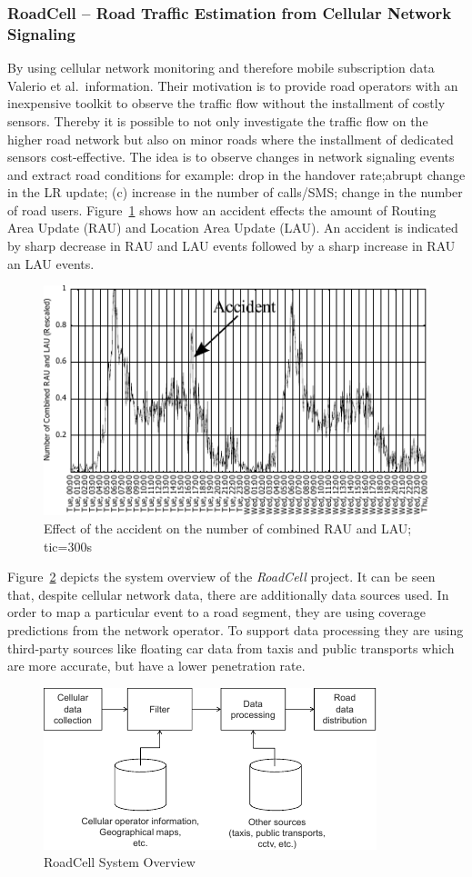 \documentclass[master,english]{hgbthesis}
\begin{document}
\subsubsection{RoadCell -- Road Traffic Estimation from Cellular Network Signaling}
By using cellular network monitoring and therefore mobile subscription data Valerio et al.\ information. Their motivation is to provide road operators with an inexpensive toolkit to observe the traffic flow without the installment of costly sensors. Thereby it is possible to not only investigate the traffic flow on the higher road network but also on minor roads where the installment of dedicated sensors cost-effective.
The idea is to observe changes in network signaling events and extract road conditions for example: drop in the handover rate;abrupt change in the LR update; (c) increase in the number of calls/SMS; change in the number of road users. Figure~\ref{fig:raodcell_accident} shows how an accident effects the amount of Routing Area Update (RAU) and Location Area Update (LAU). An accident is indicated by sharp decrease in RAU and LAU events followed by a sharp increase in RAU an LAU events.
\begin{figure}
\centering
\includegraphics[width=0.7\linewidth]{./images/raodcell_accident}
\caption{Effect of the accident on the number of combined RAU and LAU; tic=300s \cite{Valerio20092}}
\label{fig:raodcell_accident}
\end{figure}
Figure~\ref{fig:roadcell} depicts the system overview of the \emph{RoadCell} project. It can be seen that, despite cellular network data, there are additionally data sources used. In order to map a particular event to a road segment, they are using coverage predictions from the network operator. To support data processing they are using third-party sources like floating car data from taxis and public transports which are more accurate, but have a lower penetration rate.
\begin{figure}
\centering
\includegraphics[width=0.7\linewidth]{./images/roadcell}
\caption{RoadCell System Overview \cite{Valerio2009}}
\label{fig:roadcell}
\end{figure}
\end{document}
